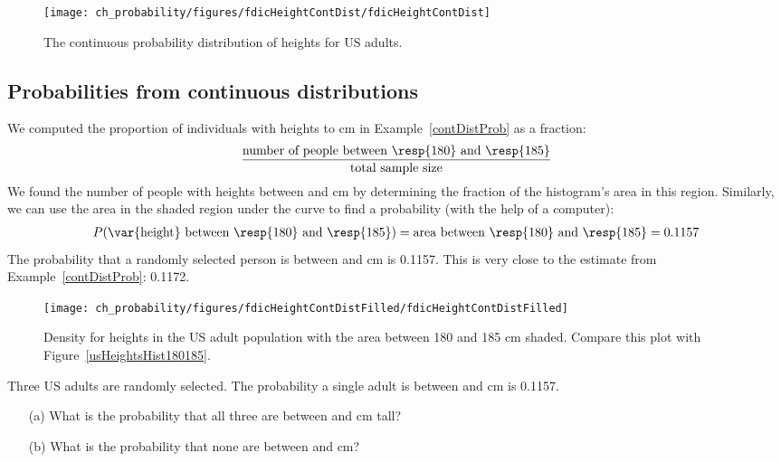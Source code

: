\begin{figure}[tbh]
\centering
\texttt{[image: ch\_probability/figures/fdicHeightContDist/fdicHeightContDist]}
\caption{The continuous probability distribution of heights for US adults.}
\label{fdicHeightContDist}
\end{figure}


\subsection{Probabilities from continuous distributions}

We computed the proportion of individuals with heights  to  cm in Example~\ref{contDistProb} as a fraction:
\begin{align*}
\frac{\text{number of people between \resp{180} and \resp{185}}}{\text{total sample size}}
\end{align*}
We found the number of people with heights between  and  cm by determining the fraction of the histogram's area in this region. Similarly, we can use the area in the shaded region under the curve to find a probability (with the help of a computer):
\begin{align*}
P(\text{\var{height} between \resp{180} and \resp{185}})
	= \text{area between \resp{180} and \resp{185}}
	= 0.1157
\end{align*}
The probability that a randomly selected person is between  and  cm is 0.1157. This is very close to the estimate from Example~\ref{contDistProb}: 0.1172. 

\begin{figure}
\centering
\texttt{[image: ch\_probability/figures/fdicHeightContDistFilled/fdicHeightContDistFilled]}
\caption{Density for heights in the US adult population with the area between 180 and 185 cm shaded. Compare this plot with Figure~\ref{usHeightsHist180185}.}
\label{fdicHeightContDistFilled}
\end{figure}

\begin{exercisewrap}
\begin{nexercise}
Three US adults are randomly selected. The probability a single adult is between  and  cm is 0.1157.\footnotemark\vspace{-1.5mm}
\begin{enumerate}
\setlength{\itemsep}{0mm}
\item[(a)] What is the probability that all three are between  and  cm tall?
\item[(b)] What is the probability that none are between  and  cm?
\end{enumerate}
\end{nexercise}
\end{exercisewrap}

